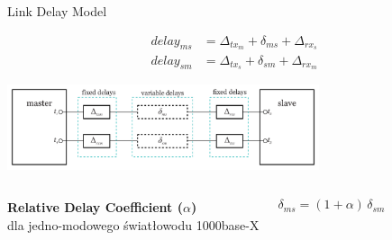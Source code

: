 \documentclass[compress,red]{beamer}
\begin{document}
% 
% 
% 
\begin{frame}{Link Delay Model}

  \begin{align}
    \nonumber delay_{ms} &= \Delta_{tx_m} + \delta_{ms} + \Delta_{rx_s} \\
    \nonumber delay_{sm} &= \Delta_{tx_s} + \delta_{sm} + \Delta_{rx_m}
  \end{align}

   \vspace{0.2cm}

  \begin{center}
  \includegraphics[height=2.5cm]{protocol/delaymodel.pdf}
  \end{center}

\begin{columns}[c]
  \column{2.8in}

    \begin{center}
      \textbf{Relative Delay Coefficient ($\alpha$)} \\
      dla jedno-modowego światłowodu 1000base-X
    \end{center}

  \column{1.5in}
    \begin{center}
      \begin{equation}
      \nonumber \delta_{ms} = (1 + \alpha) \, \delta_{sm}
      \end{equation}
    \end{center}
    \vspace{0.5cm}
\end{columns}
  

\end{frame}
\end{document}
